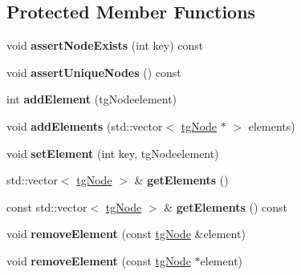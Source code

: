 \subsection*{Protected Member Functions}
\begin{DoxyCompactItemize}
\item 
\hypertarget{classtg_nodes_aa6bb3e58cae9ddf9433361dd9b76f8a9}{void {\bfseries assert\-Node\-Exists} (int key) const }\label{classtg_nodes_aa6bb3e58cae9ddf9433361dd9b76f8a9}

\item 
\hypertarget{classtg_nodes_ab320cd229039b9e4b054d071001098c5}{void {\bfseries assert\-Unique\-Nodes} () const }\label{classtg_nodes_ab320cd229039b9e4b054d071001098c5}

\item 
\hypertarget{classtg_taggables_a1ec887791db68183f81e07b173191885}{int {\bfseries add\-Element} (tg\-Nodeelement)}\label{classtg_taggables_a1ec887791db68183f81e07b173191885}

\item 
\hypertarget{classtg_taggables_a74a6535cefcc552eb7edf330908526b1}{void {\bfseries add\-Elements} (std\-::vector$<$ \hyperlink{classtg_node}{tg\-Node} $\ast$ $>$ elements)}\label{classtg_taggables_a74a6535cefcc552eb7edf330908526b1}

\item 
\hypertarget{classtg_taggables_a67f59350e693840f529b1296d6dce24e}{void {\bfseries set\-Element} (int key, tg\-Nodeelement)}\label{classtg_taggables_a67f59350e693840f529b1296d6dce24e}

\item 
\hypertarget{classtg_taggables_a84d597b78dd84f0b283fcc29a7d6870e}{std\-::vector$<$ \hyperlink{classtg_node}{tg\-Node} $>$ \& {\bfseries get\-Elements} ()}\label{classtg_taggables_a84d597b78dd84f0b283fcc29a7d6870e}

\item 
\hypertarget{classtg_taggables_aa02f05de49b941454ced7b9acc9be80e}{const std\-::vector$<$ \hyperlink{classtg_node}{tg\-Node} $>$ \& {\bfseries get\-Elements} () const}\label{classtg_taggables_aa02f05de49b941454ced7b9acc9be80e}

\item 
\hypertarget{classtg_taggables_a15e9f671d96021a4f6a05d1c19eed441}{void {\bfseries remove\-Element} (const \hyperlink{classtg_node}{tg\-Node} \&element)}\label{classtg_taggables_a15e9f671d96021a4f6a05d1c19eed441}

\item 
\hypertarget{classtg_taggables_a6b5950b18acd5905dfbed9d97ac7dc82}{void {\bfseries remove\-Element} (const \hyperlink{classtg_node}{tg\-Node} $\ast$element)}\label{classtg_taggables_a6b5950b18acd5905dfbed9d97ac7dc82}


\end{DoxyCompactItemize}
